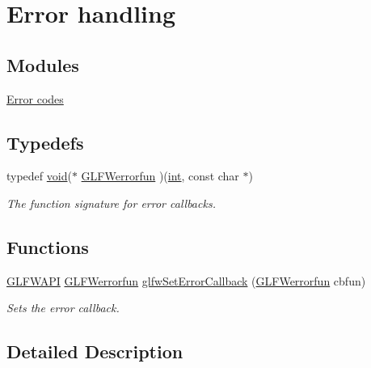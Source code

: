 \hypertarget{group__error}{\section{Error handling}
\label{group__error}
}
\subsection*{Modules}
\begin{DoxyCompactItemize}
\item 
\hyperlink{group__errors}{Error codes}
\end{DoxyCompactItemize}
\subsection*{Typedefs}
\begin{DoxyCompactItemize}
\item 
typedef \hyperlink{wglew_8h_aeea6e3dfae3acf232096f57d2d57f084}{void}($\ast$ \hyperlink{group__error_ga6f2c8574259246a83b1d0c3baf23046f}{G\-L\-F\-Werrorfun} )(\hyperlink{wglew_8h_a500a82aecba06f4550f6849b8099ca21}{int}, const char $\ast$)
\begin{DoxyCompactList}\small\item\em The function signature for error callbacks. \end{DoxyCompactList}\end{DoxyCompactItemize}
\subsection*{Functions}
\begin{DoxyCompactItemize}
\item 
\hyperlink{glfw3_8h_a56da5036b2cc259351ae22fd6439bb47}{G\-L\-F\-W\-A\-P\-I} \hyperlink{group__error_ga6f2c8574259246a83b1d0c3baf23046f}{G\-L\-F\-Werrorfun} \hyperlink{group__error_ga5919096b958c47102126061fb5a6f9c3}{glfw\-Set\-Error\-Callback} (\hyperlink{group__error_ga6f2c8574259246a83b1d0c3baf23046f}{G\-L\-F\-Werrorfun} cbfun)
\begin{DoxyCompactList}\small\item\em Sets the error callback. \end{DoxyCompactList}\end{DoxyCompactItemize}


\subsection{Detailed Description}


